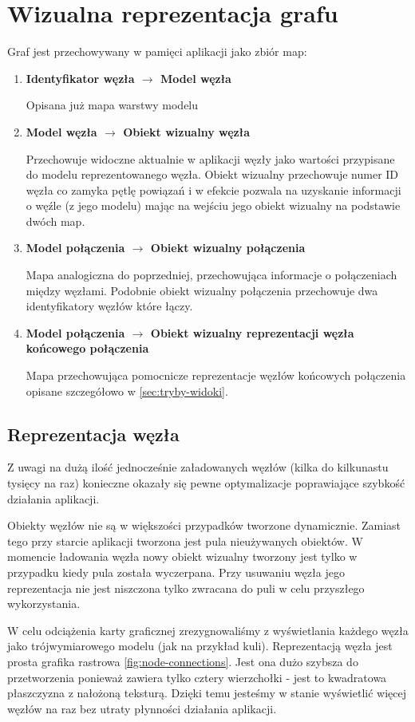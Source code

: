 \section{Wizualna reprezentacja grafu}
\label{sec:graf-reprezentacja}

\newcommand\mapitem[3]{
	\item \textbf{#1 $\to$ #2}

	#3
}

\noindent
Graf jest przechowywany w pamięci aplikacji jako zbiór map:
\begin{enumerate}[label=\textbullet]
	\mapitem{Identyfikator węzła}{Model węzła}{Opisana już mapa warstwy modelu}
	\mapitem{Model węzła}{Obiekt wizualny węzła}{Przechowuje widoczne aktualnie w aplikacji węzły jako wartości przypisane do modelu reprezentowanego węzła. Obiekt wizualny przechowuje numer ID węzła co zamyka pętlę powiązań i w efekcie pozwala na uzyskanie informacji o węźle (z jego modelu) mając na wejściu jego obiekt wizualny na podstawie dwóch map.}
	\mapitem{Model połączenia}{Obiekt wizualny połączenia}{Mapa analogiczna do poprzedniej, przechowująca informacje o połączeniach między węzłami. Podobnie obiekt wizualny połączenia przechowuje dwa identyfikatory węzłów które łączy.}
	
	\mapitem{Model połączenia}{Obiekt wizualny reprezentacji węzła końcowego połączenia}{Mapa przechowująca pomocnicze reprezentacje węzłów końcowych połączenia opisane szczegółowo w \ref{sec:tryby-widoki}.}
\end{enumerate}

\subsection{Reprezentacja węzła} Z uwagi na dużą ilość jednocześnie załadowanych węzłów (kilka do kilkunastu tysięcy na raz) konieczne okazały się pewne optymalizacje poprawiające szybkość działania aplikacji. 

Obiekty węzłów nie są w większości przypadków tworzone dynamicznie. Zamiast tego przy starcie aplikacji tworzona jest pula nieużywanych obiektów. W momencie ładowania węzła nowy obiekt wizualny tworzony jest tylko w przypadku kiedy pula została wyczerpana. Przy usuwaniu węzła jego reprezentacja nie jest niszczona tylko zwracana do puli w celu przyszłego wykorzystania.

W celu odciążenia karty graficznej zrezygnowaliśmy z wyświetlania każdego węzła jako trójwymiarowego modelu (jak na przykład kuli). Reprezentacją węzła jest prosta grafika rastrowa \ref{fig:node-connections}. Jest ona dużo szybsza do przetworzenia ponieważ zawiera tylko cztery wierzchołki - jest to kwadratowa płaszczyzna z nałożoną teksturą. Dzięki temu jesteśmy w stanie wyświetlić więcej węzłów na raz bez utraty płynności działania aplikacji.

